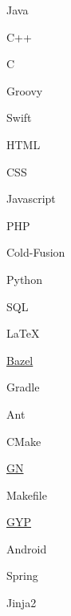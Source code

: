  {
    \item Java
    \item C++
    \item C
    \item Groovy
    \item Swift
}

 {
    \item HTML
    \item CSS
    \item Javascript
    \item PHP
    \item Cold-Fusion
}

 {
    \item Python
    \item SQL
    \item \LaTeX
}

 {
    \item \href {https://bazel.build} {Bazel}
    \item Gradle
    \item Ant
    \item CMake
    \item \href {https://chromium.googlesource.com/chromium/src/tools/gn/+/master/README.md} {GN}
    \item Makefile
    \item \href {https://gyp.gsrc.io} {GYP}
}

 {
    \item Android
    \item Spring
    \item Jinja2
}

